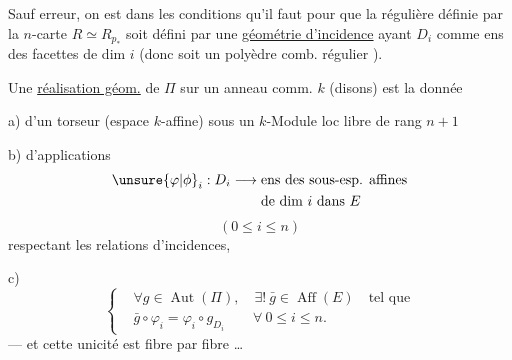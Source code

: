 Sauf erreur, on est dans les conditions qu'il faut pour que la  régulière définie par la $n$-carte $R\simeq R_{p_*}$ soit défini par une \uline{géométrie d'incidence} ayant  $D_i$ comme ens des facettes de dim $i$ (donc soit un polyèdre comb. régulier \inserted{$\Pi$}).

Une \uline{réalisation géom.}  de $\Pi$  sur un  anneau comm. $k$ (disons) est la donnée

a) d'un torseur (espace $k$-affine)  sous un $k$-Module loc libre de rang $n+1$

b) d'applications
\[
\begin{aligned}
\unsure{\varphi|\phi}_i:D_i\longrightarrow{}&\text{ens des sous-esp. affines}\\
&\text{de dim }i\text{ dans }E
\end{aligned}
\]
\[
(0\leq i\leq n)
\]
respectant les relations d'incidences,


 
 

c)
\[
\left\{\begin{aligned}
&\forall g\in\operatorname{Aut}(\Pi),\quad\exists!\ \bar{g}\in\operatorname{Aff}(E)\quad\text{tel que}\\
&\bar{g}\circ\varphi_i=\varphi_i\circ g_{D_i}\qquad\forall\ 0\leq i\leq n.
\end{aligned}\right.
\]
--- et cette unicité est  fibre par fibre \dots
